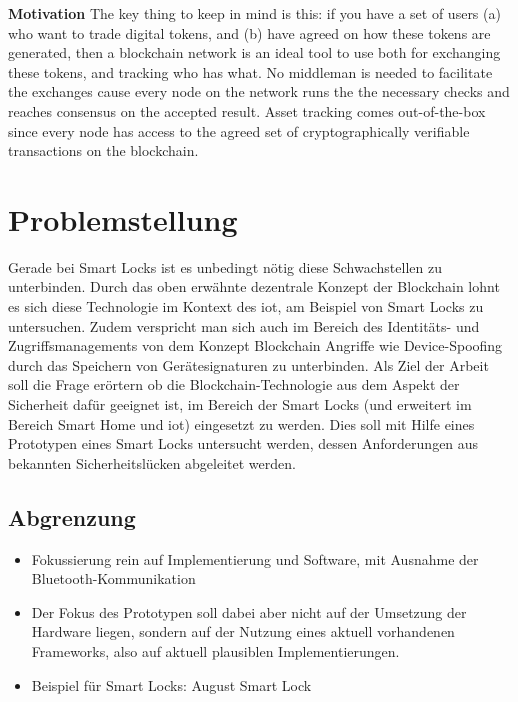     \noindent\textbf{Motivation}\newline
    The key thing to keep in mind is this: if you have a set of users (a) who want to trade digital tokens, and (b) have agreed on how these tokens are generated, then a blockchain network is an ideal tool to use both for exchanging these tokens, and tracking who has what. No middleman is needed to facilitate the exchanges cause every node on the network runs the the necessary checks and reaches consensus on the accepted result. Asset tracking comes out-of-the-box since every node has access to the agreed set of cryptographically verifiable transactions on the blockchain.\cite{Christidis2016}
    \newline\smallskip
    
\section{Problemstellung}
    Gerade bei Smart Locks ist es unbedingt nötig diese Schwachstellen zu unterbinden.
    Durch das oben erwähnte dezentrale Konzept der Blockchain\cite{Nakamoto2008} lohnt es sich diese Technologie im Kontext des \gls{iot}, am Beispiel von Smart Locks zu untersuchen.
    Zudem verspricht man sich auch im Bereich des Identitäts- und Zugriffsmanagements von dem Konzept Blockchain Angriffe wie Device-Spoofing durch das Speichern von Gerätesignaturen zu unterbinden\cite{Kshetri2017}.
    \newline
    \noindent Als Ziel der Arbeit soll die Frage erörtern ob die Block\-chain\--Tech\-no\-lo\-gie aus dem Aspekt der Sicherheit dafür geeignet ist, im Bereich der Smart Locks (und erweitert im Bereich Smart Home und \gls{iot}) eingesetzt zu werden.
    Dies soll mit Hilfe eines Prototypen eines Smart Locks untersucht werden, dessen Anforderungen aus bekannten Sicherheitslücken abgeleitet werden.
    
    
    \subsection{Abgrenzung}
    	\begin{itemize}
    		\item Fokussierung rein auf Implementierung und Software, mit Ausnahme der Bluetooth-Kommunikation
    		\item Der Fokus des Prototypen soll dabei aber nicht auf der Umsetzung der Hardware liegen, sondern auf der Nutzung eines aktuell vorhandenen Frameworks, also auf aktuell plausiblen Implementierungen. 
    		\item Beispiel für Smart Locks: August Smart Lock
    	\end{itemize}

